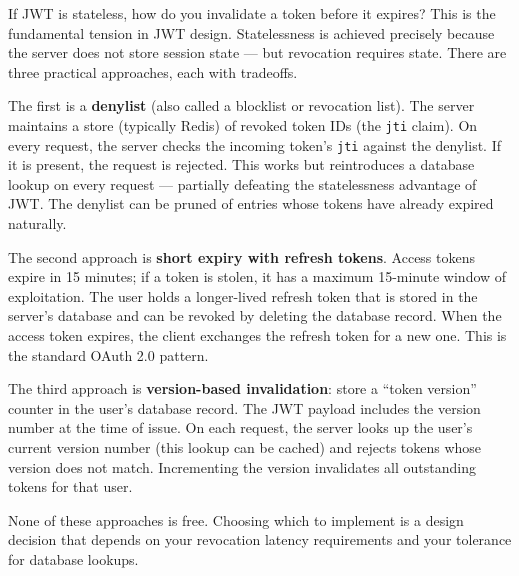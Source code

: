 \documentclass[11pt,a4paper]{article}
\begin{document}
\begin{curiobox}{If JWT is stateless, how do you invalidate a token before it expires?}
This is the fundamental tension in JWT design. Statelessness is achieved precisely because the server does not store session state --- but revocation requires state. There are three practical approaches, each with tradeoffs.

The first is a \textbf{denylist} (also called a blocklist or revocation list). The server maintains a store (typically Redis) of revoked token IDs (the \texttt{jti} claim). On every request, the server checks the incoming token's \texttt{jti} against the denylist. If it is present, the request is rejected. This works but reintroduces a database lookup on every request --- partially defeating the statelessness advantage of JWT. The denylist can be pruned of entries whose tokens have already expired naturally.

The second approach is \textbf{short expiry with refresh tokens}. Access tokens expire in 15 minutes; if a token is stolen, it has a maximum 15-minute window of exploitation. The user holds a longer-lived refresh token that is stored in the server's database and can be revoked by deleting the database record. When the access token expires, the client exchanges the refresh token for a new one. This is the standard OAuth 2.0 pattern.

The third approach is \textbf{version-based invalidation}: store a ``token version'' counter in the user's database record. The JWT payload includes the version number at the time of issue. On each request, the server looks up the user's current version number (this lookup can be cached) and rejects tokens whose version does not match. Incrementing the version invalidates all outstanding tokens for that user.

None of these approaches is free. Choosing which to implement is a design decision that depends on your revocation latency requirements and your tolerance for database lookups.
\end{curiobox}
\end{document}
